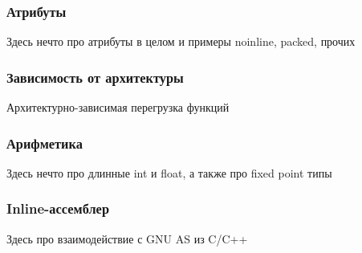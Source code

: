 \documentclass[a4paper,12pt,oneside]{article}
\begin{document}
\subsubsection{Атрибуты}

Здесь нечто про атрибуты в целом и примеры noinline, packed, прочих

\subsubsection{Зависимость от архитектуры}

Архитектурно-зависимая перегрузка функций

\subsubsection{Арифметика}

Здесь нечто про длинные int и float, а также про fixed point типы

\subsubsection{Inline-ассемблер}

Здесь про взаимодействие с GNU AS из C/C++

\pagebreak
{}
\listoffigures
\end{document}
